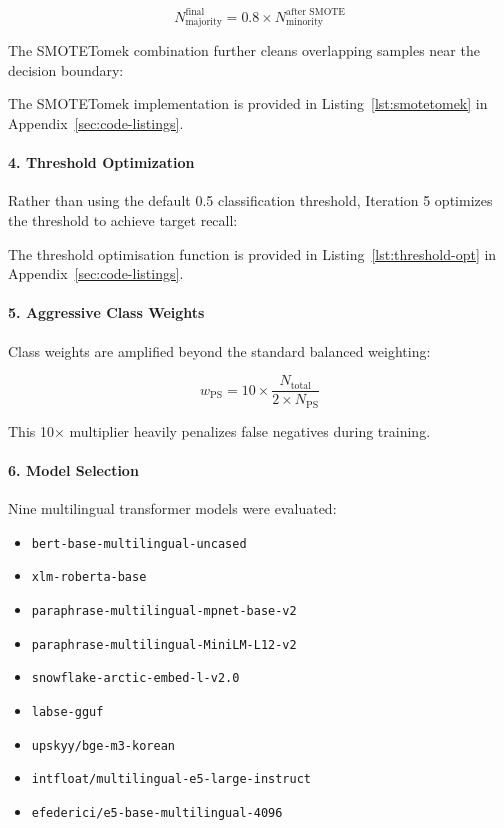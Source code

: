 \documentclass[11pt, titlepage, bibliography=totoc]{scrreprt}
\begin{document}
\begin{equation}
N_{\text{majority}}^{\text{final}} = 0.8 \times N_{\text{minority}}^{\text{after SMOTE}}
\end{equation}

The SMOTETomek combination further cleans overlapping samples near the decision boundary:

The SMOTETomek implementation is provided in Listing~\ref{lst:smotetomek} in Appendix~\ref{sec:code-listings}.

\paragraph{4. Threshold Optimization}
Rather than using the default 0.5 classification threshold, Iteration 5 optimizes the threshold to achieve target recall:

The threshold optimisation function is provided in Listing~\ref{lst:threshold-opt} in Appendix~\ref{sec:code-listings}.

\paragraph{5. Aggressive Class Weights}
Class weights are amplified beyond the standard balanced weighting:

\begin{equation}
w_{\text{PS}} = 10 \times \frac{N_{\text{total}}}{2 \times N_{\text{PS}}}
\end{equation}

This 10$\times$ multiplier heavily penalizes false negatives during training.

\paragraph{6. Model Selection}
Nine multilingual transformer models were evaluated:

\begin{itemize}
    \item \texttt{bert-base-multilingual-uncased}
    \item \texttt{xlm-roberta-base}
    \item \texttt{paraphrase-multilingual-mpnet-base-v2}
    \item \texttt{paraphrase-multilingual-MiniLM-L12-v2}
    \item \texttt{snowflake-arctic-embed-l-v2.0}
    \item \texttt{labse-gguf}
    \item \texttt{upskyy/bge-m3-korean}
    \item \texttt{intfloat/multilingual-e5-large-instruct}
    \item \texttt{efederici/e5-base-multilingual-4096}
\end{itemize}
\end{document}
